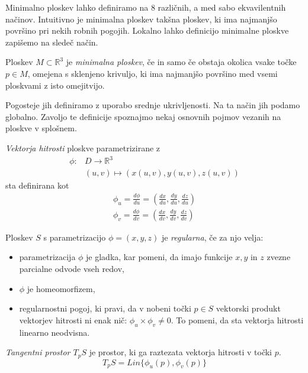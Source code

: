 \documentclass[mat1]{fmfdelo}
\newcommand{\R}{\mathbb R}
\begin{document}
Minimalno ploskev lahko definiramo na $8$ različnih, a med sabo ekvavilentnih načinov.
Intuitivno je minimalna ploskev takšna ploskev, ki ima najmanjšo površino pri nekih robnih pogojih. 
Lokalno lahko definicijo minimalne ploskve zapišemo na sledeč način.

\begin{definicija}
    Ploskev $M \subset \mathbb{R} ^3$ je \emph{minimalna ploskev}, če in samo če obstaja okolica vsake točke $p \in M$, omejena s 
    sklenjeno krivuljo, ki ima najmanjšo površino med vsemi ploskvami z isto omejitvijo.
\end{definicija}


Pogosteje jih definiramo z uporabo srednje ukrivljenosti. Na ta način jih podamo  globalno.
Zavoljo te definicije spoznajmo nekaj osnovnih pojmov vezanih na ploskve v splošnem.

\begin{definicija}
    \emph{Vektorja hitrosti} ploskve parametrizirane z 
    \begin{align*}
        \phi : & D \to \R^3 \\
        & (u, v) \mapsto (x(u, v), y(u, v), z(u, v))
    \end{align*}
    sta definirana kot 
    \begin{align*}
        \phi_u = \frac{d\phi}{du} = (\frac{dx}{du}, \frac{dy}{du}, \frac{dz}{du})  \\
        \phi_v = \frac{d\phi}{dv} = (\frac{dx}{dv}, \frac{dy}{dv}, \frac{dz}{dv})
    \end{align*}
\end{definicija}

\begin{definicija}
    Ploskev $S$ s parametrizacijo $\phi = (x, y, z)$ je \emph{regularna}, če za njo velja:
    \begin{itemize}
        \item parametrizacija $\phi$ je gladka, kar pomeni, da imajo funkcije $x, y \text{ in } z$ zvezne parcialne odvode vseh redov,
        \item $\phi$ je homeomorfizem, 
        \item regularnostni pogoj, ki pravi, da v nobeni točki $p \in S$ vektorski produkt vektorjev hitrosti ni enak nič: $\phi_u \times \phi_v \neq 0$. To pomeni, da sta vektorja hitrosti linearno neodvisna.
    \end{itemize}    
\end{definicija}

\begin{definicija}
    \emph{Tangentni prostor $T_p S$} je prostor, ki ga raztezata vektorja hitrosti v točki $p$.
    $$ T_p S = Lin\{ \phi_u (p), \phi_v (p) \} $$
\end{definicija}
\end{document}
